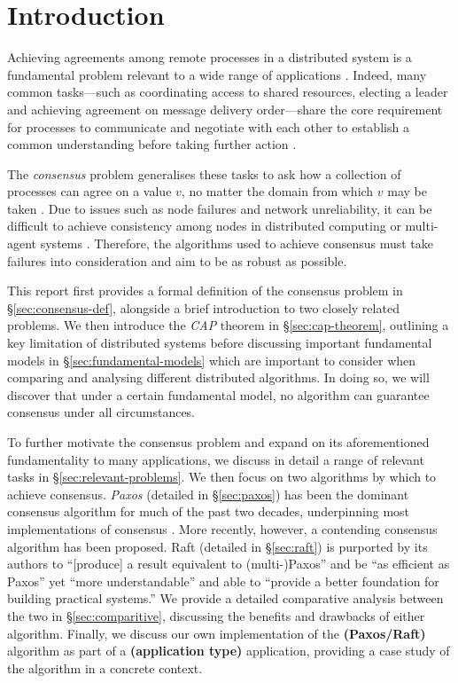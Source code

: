 \documentclass[12pt, a4paper]{article}
\begin{document}
\section{Introduction}

Achieving agreements among remote processes in a distributed system is a
fundamental problem relevant to a wide range of applications
\cite{fischer1985impossibility, kshemkalyani_singhal_2008}. Indeed, many common
tasks---such as coordinating access to shared resources, electing a leader and
achieving agreement on message delivery order---share the core requirement for
processes to communicate and negotiate with each other to establish a common
understanding before taking further action \cite{kshemkalyani_singhal_2008,
coulouris2005distributed}.

The \textit{consensus} problem generalises these tasks to ask how a collection
of processes can agree on a value $v$, no matter the domain from which $v$ may
be taken \cite{coulouris2005distributed}. Due to issues such as node failures
and network unreliability, it can be difficult to achieve consistency among
nodes in distributed computing or multi-agent systems
\cite{coulouris2005distributed}. Therefore, the algorithms used to achieve
consensus must take failures into consideration and aim to be as robust as
possible.

This report first provides a formal definition of the consensus problem in
\S\ref{sec:consensus-def}, alongside a brief introduction to two closely related
problems. We then introduce the \textit{CAP} theorem in \S\ref{sec:cap-theorem},
outlining a key limitation of distributed systems before discussing important
fundamental models in \S\ref{sec:fundamental-models} which are important to
consider when comparing and analysing different distributed algorithms. In doing
so, we will discover that under a certain fundamental model, no algorithm can
guarantee consensus under all circumstances.

To further motivate the consensus problem and expand on its aforementioned
fundamentality to many applications, we discuss in detail a range of relevant
tasks in \S\ref{sec:relevant-problems}. We then focus on two algorithms by which
to achieve consensus. \textit{Paxos} \cite{lamport1998part, lamport2001paxos}
(detailed in \S\ref{sec:paxos}) has been the dominant consensus algorithm for
much of the past two decades, underpinning most implementations of consensus
\cite{ongaro2014search}. More recently, however, a contending consensus
algorithm has been proposed. Raft \cite{ongaro2014search} (detailed in
\S\ref{sec:raft}) is purported by its authors to ``[produce] a result equivalent
to (multi-)Paxos'' and be ``as efficient as Paxos'' yet ``more understandable''
and able to ``provide a better foundation for building practical systems.''
\cite{ongaro2014search} We provide a detailed comparative analysis between the
two in \S\ref{sec:comparitive}, discussing the benefits and drawbacks of either
algorithm. Finally, we discuss our own implementation of the
\textbf{(Paxos/Raft)} algorithm as part of a \textbf{(application type)}
application, providing a case study of the algorithm in a concrete context.
\end{document}
